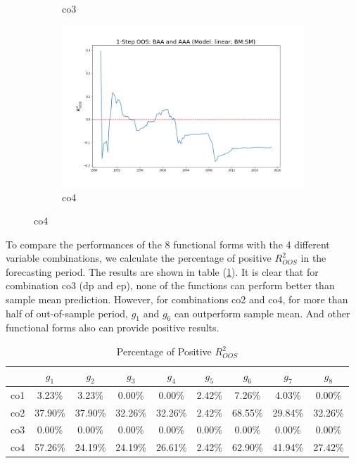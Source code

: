 \documentclass[a4paper,12pt,times,numbered,print,index]{report}
\numberwithin{equation}{section}
\begin{document}
\begin{figure}[!htbp]
\begin{subfigure}[b]{0.42\linewidth}
		\caption{co3}
	\end{subfigure}
	\begin{subfigure}[b]{0.42\linewidth}
		\includegraphics[width=0.9\linewidth]{OOS_plots/linear_co4_SM.png}
		\caption{co4}
	\end{subfigure}
	\label{g8}
\end{figure}
\pagebreak

To compare the performances of the 8 functional forms with the 4 different variable combinations, we calculate the percentage of positive $R^2_{OOS}$ in the forecasting period. The results are shown in table (\ref{perct}). It is clear that for combination co3 (dp and ep), none of the functions can perform better than sample mean prediction. However, for combinations co2 and co4, for more than half of out-of-sample period, $g_1$ and $g_6$ can outperform sample mean. And other functional forms also can provide positive results. 

\begin{table}[htbp]
  \centering
  \caption{Percentage of Positive $R^2_{OOS}$}
    \begin{tabular}{ccccccccc}
    \toprule
          & $g_1$    & $g_2$    & $g_3$    & $g_4$    & $g_5$    & $g_6$    & $g_7$    & $g_8$ \\
    \midrule
    co1   & 3.23\% & 3.23\% & 0.00\% & 0.00\% & 2.42\% & 7.26\% & 4.03\% & 0.00\% \\
    co2   & 37.90\% & 37.90\% & 32.26\% & 32.26\% & 2.42\% & \textcolor[rgb]{ .753,  0,  0}{68.55\%} & 29.84\% & 32.26\% \\
    co3   & 0.00\% & 0.00\% & 0.00\% & 0.00\% & 0.00\% & 0.00\% & 0.00\% & 0.00\% \\
    co4   & \textcolor[rgb]{ .753,  0,  0}{57.26\%} & 24.19\% & 24.19\% & 26.61\% & 2.42\% & \textcolor[rgb]{ .753,  0,  0}{62.90\%} & 41.94\% & 27.42\% \\
    \bottomrule
    \bottomrule
    \end{tabular}%
  \label{perct}%
\end{table}%
\end{document}
